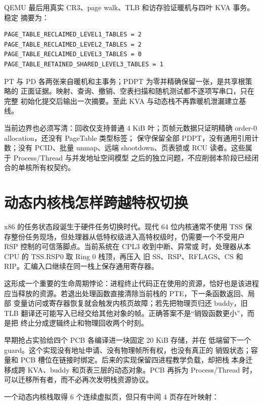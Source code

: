QEMU 最后用真实 CR3、page walk、TLB 和访存验证暖机与四叶 KVA 事务。稳定
摘要为：

\begin{verbatim}
PAGE_TABLE_RECLAIMED_LEVEL1_TABLES = 2
PAGE_TABLE_RECLAIMED_LEVEL2_TABLES = 2
PAGE_TABLE_RECLAIMED_LEVEL3_TABLES = 0
PAGE_TABLE_RETAINED_SHARED_LEVEL3_TABLES = 1
\end{verbatim}

PT 与 PD 各两张来自暖机和主事务；PDPT 为零并精确保留一张，是共享根策略的
正面证据。映射、查询、撤销、空表扫描和随机测试都不逐项写串口，只在完整
初始化提交后输出一次摘要。至此 KVA 与动态栈不再靠暖机泄漏建立基线。

当前边界也必须写清：回收仅支持普通 4 KiB 叶；页帧元数据只证明精确
order-0 allocation，还没有 PageTable 类型标签；
保守保留全部 PDPT，没有通用引用计数；没有 PCID、批量 unmap、远端
shootdown、页表锁或 RCU 读者。这些属于 Process/Thread 与并发地址空间模型
之后的独立问题，不应削弱本阶段已经闭合的单核所有权契约。

\section{动态内核栈怎样跨越特权切换}
x86 的任务状态段诞生于硬件任务切换时代。现代 64 位内核通常不使用 TSS
保存整份任务现场，但处理器从低特权级进入高特权级时，仍需要一个不受用户
RSP 控制的可信落脚点。当前系统在 CPL3 收到中断、异常或
 时，处理器从本 CPU 的 TSS.RSP0 取 Ring 0 栈顶，再压入
旧 SS、RSP、RFLAGS、CS 和 RIP。汇编入口继续在同一栈上保存通用寄存器。

这形成一个重要的生命周期悖论：进程终止代码正在使用的资源，恰好也是该进程
应当释放的资源。若退出处理函数直接清除当前栈的 PTE，下一条函数返回、局部
变量访问或寄存器恢复就会触发内核页故障；若先把物理页归还 buddy，旧 TLB
翻译还可能写入已经交给其他对象的帧。正确答案不是“销毁函数更小”，而是把
终止分成逻辑终止和物理回收两个时刻。

早期抢占实验给四个 PCB 各编译进一块固定 20 KiB 存储，并在
低端留下一个 guard。这个实现没有地址申请、没有物理帧所有权，也没有真正的
销毁状态；容量和 PCB 槽位在链接时绑定。后来的实现保留四进程教学负载，却把栈
本身迁移成跨 KVA、buddy 和页表三层的动态对象。PCB 再拆为
Process/Thread 时，可以迁移所有者，而不必再次发明栈资源协议。

一个动态内核栈取得 6 个连续虚拟页，但只有中间 4 页存在叶映射：

